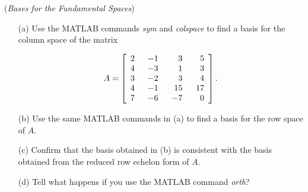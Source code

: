\begin{exer}
(\textit{Bases for the Fundamental Spaces})

\begin{enumerate}

\item[(a)] Use the MATLAB commands \textit{sym} and \textit{colspace} to find a basis for the column space of the matrix

\begin{displaymath}
A = \left[\begin{array}{rrrr} 2& \hspace{2mm} -1& \hspace{5mm} 3&\hspace{4mm} 5\\ 4 & -3 & 1 & 3 \\ 3 & -2 & 3 & 4 \\ 4 & -1 & 15 & 17 \\ 7 & -6 & -7 & 0 \end{array} \right].
\end{displaymath}

\vspace{1mm}

\item[(b)] Use the same MATLAB commands in (a) to find a basis for the row space of $A$.

\vspace{1mm}

\item[(c)] Confirm that the basis obtained in (b) is consistent with the basis obtained from the reduced row echelon form of $A$.

\vspace{1mm}

\item[(d)] Tell what happens if you use the MATLAB command \textit{orth}?

\end{enumerate}
\end{exer}



